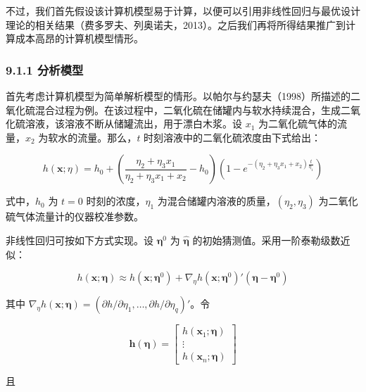 \documentclass{ctexart}
\begin{document}
不过，我们首先假设该计算机模型易于计算，以便可以引用非线性回归与最优设计理论的相关结果（费多罗夫、列奥诺夫，2013）。之后我们再将所得结果推广到计算成本高昂的计算机模型情形。

\subsubsection*{9.1.1 分析模型}

首先考虑计算机模型为简单解析模型的情形。以帕尔与约瑟夫（1998）所描述的二氧化硫混合过程为例。在该过程中，二氧化硫在储罐内与软水持续混合，生成二氧化硫溶液，该溶液不断从储罐流出，用于漂白木浆。设 $x_1$ 为二氧化硫气体的流量，$x_2$ 为软水的流量。那么，$t$ 时刻溶液中的二氧化硫浓度由下式给出：

\begin{equation*}
h(\boldsymbol{x};\eta)=h_0+\left(\frac{\eta_2+\eta_3x_1}{\eta_2+\eta_3x_1+x_2}-h_0\right)\left(1-e^{-(\eta_2+\eta_3x_1+x_2)\frac{t}{\eta_1}}\right)
\tag{9.8}
\end{equation*}

式中，$h_0$ 为 $t=0$ 时刻的浓度，$\eta_1$ 为混合储罐内溶液的质量，$(\eta_2,\eta_3)$ 为二氧化硫气体流量计的仪器校准参数。

非线性回归可按如下方式实现。设 $\boldsymbol{\eta}^0$ 为 $\widehat{\boldsymbol{\eta}}$ 的初始猜测值。采用一阶泰勒级数近似：

\begin{equation*}
h(\boldsymbol{x};\boldsymbol{\eta})\approx h(\boldsymbol{x};\boldsymbol{\eta}^0)+\nabla_{\eta} h(\boldsymbol{x};\boldsymbol{\eta}^0)'(\boldsymbol{\eta}-\boldsymbol{\eta}^0)
\end{equation*}

其中 $\nabla_{\eta} h(\boldsymbol{x};\boldsymbol{\eta})=(\partial h/\partial\eta_1,\dots,\partial h/\partial\eta_q)'$。令

\begin{equation*}
\boldsymbol{h}(\boldsymbol{\eta})=\begin{bmatrix}h(\boldsymbol{x}_1;\boldsymbol{\eta})\\\vdots\\h(\boldsymbol{x}_n;\boldsymbol{\eta})\end{bmatrix}
\end{equation*}

且
\end{document}
